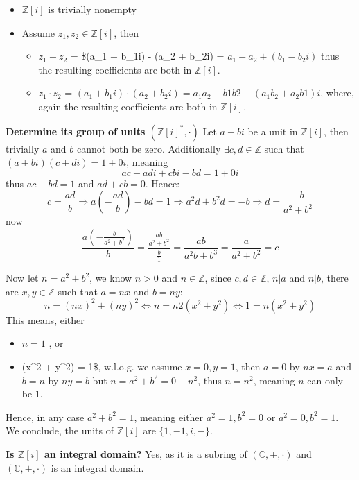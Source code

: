 \documentclass[
]{article}
\providecommand{\tightlist}{%
  \setlength{\itemsep}{0pt}\setlength{\parskip}{0pt}}
\begin{document}
\begin{itemize}
\tightlist
\item
  \(\mathbb{Z}[i]\) is trivially nonempty
\item
  Assume \(z_1,z_2 \in \mathbb{Z}[i]\), then

  \begin{itemize}
  \tightlist
  \item
    \(z_1 - z_2\) = \$(a\_1 + b\_1i) - (a\_2 + b\_2i) =
    \(a_1-a_2 + (b_1 - b_2 i)\) thus the resulting coefficients are both
    in \(\mathbb{Z}[i]\).
  \item
    \(z_1 \cdot z_2\) =
    \((a_1 + b_1i) \cdot (a_2 +b_2i) = a_1a_2 - b1b2 + (a_1b_2 + a_2b1)i\),
    where, again the resulting coefficients are both in
    \(\mathbb{Z}[i]\).
  \end{itemize}
\end{itemize}

\textbf{Determine its group of units \((\mathbb{Z}[i]^*, \cdot)\)} Let
\(a+bi\) be a unit in \(\mathbb{Z}[i]\), then trivially \(a\) and \(b\)
cannot both be zero. Additionally \(\exists c,d \in \mathbb{Z}\) such
that \((a+bi)(c+di) = 1+0i\), meaning \[
ac + adi + cbi -bd = 1 + 0i
\] thus \(ac-bd = 1\) and \(ad +cb = 0\). Hence: \[
c = \frac{ad}{b} \Rightarrow a(-\frac{ad}{b}) - bd = 1 \Rightarrow a^2d+b^2d = -b \Rightarrow  d = \frac{-b}{a^2+b^2}
\] now \[
\frac{a(-\frac{b}{a^2+b^2})}{b} = \frac{\frac{ab}{a^2+b^2}}{\frac{b}{1}} = \frac{ab}{a^2b + b^3} = \frac{a}{a^2+b^2} = c
\]

Now let \(n = a^2+b^2\), we know \(n >0\) and \(n \in \mathbb{Z}\),
since \(c,d \in \mathbb{Z}\), \(n |a\) and \(n |b\), there are
\(x,y \in \mathbb{Z}\) such that \(a = nx\) and \(b = ny\): \[
n = (nx)^2 + (ny)^2 \Leftrightarrow n = n2(x^2+y^2) \Leftrightarrow 1 = n(x^2+y^2)
\] This means, either

\begin{itemize}
\tightlist
\item
  \(n = 1\) , or
\item
  (x\^{}2 + y\^{}2) = 1\$, w.l.o.g. we assume \(x = 0, y = 1\), then
  \(a = 0\) by \(nx = a\) and \(b = n\) by \(ny = b\) but
  \(n = a^2 +b^2 = 0 +n^2\), thus \(n = n^2\), meaning \(n\) can only be
  \(1\).
\end{itemize}

Hence, in any case \(a^2+b^2 = 1\), meaning either \(a^2 = 1, b^2 = 0\)
or \(a^2 = 0, b^2 = 1\). We conclude, the units of \(\mathbb{Z}[i]\) are
\(\{1, -1, i, -\}\).

\textbf{Is \(\mathbb{Z}[i]\) an integral domain?} Yes, as it is a
subring of \((\mathbb{C},+,\cdot)\) and \((\mathbb{C},+,\cdot)\) is an
integral domain.
\end{document}
